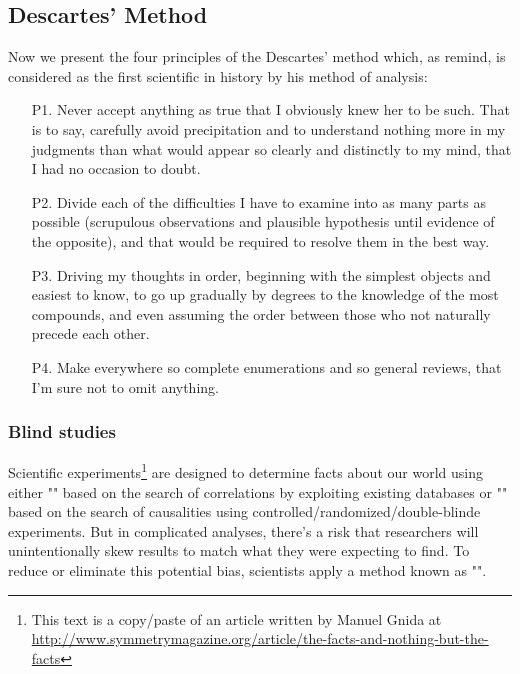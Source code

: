 	\subsection{Descartes' Method}
	Now we present the four principles of the Descartes' method which, as remind, is considered as the first scientific in history by his method of analysis:
	\begin{itemize}
	\item[P1.] Never accept anything as true that I obviously knew her to be such. That is to say, carefully avoid precipitation and to understand nothing more in my judgments than what would appear so clearly and distinctly to my mind, that I had no occasion to doubt.
	
	\item[P2.] Divide each of the difficulties I have to examine into as many parts as possible (scrupulous observations and plausible hypothesis until evidence of the opposite), and that would be required to resolve them in the best way.
	
	\item[P3.] Driving my thoughts in order, beginning with the simplest objects and easiest to know, to go up gradually by degrees to the knowledge of the most compounds, and even assuming the order between those who not naturally precede each other.
	
	\item[P4.] Make everywhere so complete enumerations and so general reviews, that I'm sure not to omit anything.
	\end{itemize}	

	\subsubsection{Blind studies}
	Scientific experiments\footnote{This text is a copy/paste of an article written by Manuel Gnida at \url{http://www.symmetrymagazine.org/article/the-facts-and-nothing-but-the-facts}} are designed to determine facts about our world using either "" based on the search of correlations by exploiting existing databases or "" based on the search of causalities using controlled/randomized/double-blinde experiments. But in complicated analyses, there's a risk that researchers will unintentionally skew results to match what they were expecting to find. To reduce or eliminate this potential bias, scientists apply a method known as "".
	

